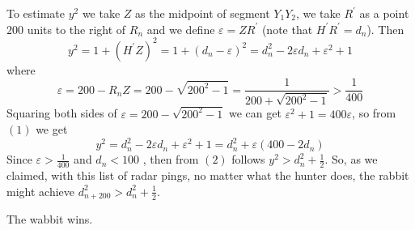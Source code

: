 \begin{problem}
To estimate $y^2$ we take $Z$ as the midpoint of segment $Y_1 Y_2$, we take $R^\prime$ as a point $200$ units to the right of $R_n$ and we define $\varepsilon = ZR^\prime$ (note that $H^\prime R^\prime= d_n$). Then 
\begin{equation}
y^2= 1+(H^\prime Z)^2=1+(d_n-\varepsilon)^2 = d_n ^2-2\varepsilon d_n +\varepsilon^2 +1
\end{equation}
where 
$$
\varepsilon = 200-R_nZ = 200 -\sqrt{200^2-1}=\frac{1}{200+\sqrt{200^2-1}}>\frac{1}{400}
$$
Squaring both sides of $\varepsilon = 200 -\sqrt{200^2-1}$ we can get $\varepsilon^2 +1 = 400\varepsilon$, so from $(1)$ we get
\begin{equation}
y^2=d_n ^2-2\varepsilon d_n +\varepsilon^2 +1=d_n^2 + \varepsilon(400-2d_n)
\end{equation}
Since $\varepsilon > \frac{1}{400}$ and $d_n <100$ , then from $(2)$ follows $y^2 > d_n^2+\frac{1}{2}$.
So, as we claimed, with this list of radar pings, no matter what the hunter does, the rabbit might achieve $d_{n+200}^2 > d_n ^2 + \frac{1}{2}$.

The wabbit wins.
\end{problem}




